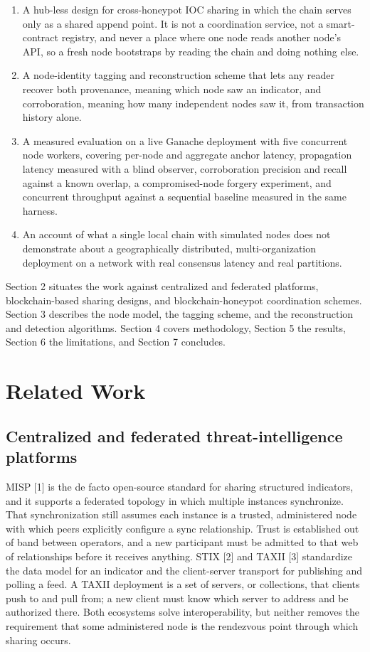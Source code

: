 \documentclass[conference]{IEEEtran}
\begin{document}
\begin{enumerate}
\item A hub-less design for cross-honeypot IOC sharing in which the chain serves only as a shared append point. It is not a coordination service, not a smart-contract registry, and never a place where one node reads another node's API, so a fresh node bootstraps by reading the chain and doing nothing else.
\item A node-identity tagging and reconstruction scheme that lets any reader recover both provenance, meaning which node saw an indicator, and corroboration, meaning how many independent nodes saw it, from transaction history alone.
\item A measured evaluation on a live Ganache deployment with five concurrent node workers, covering per-node and aggregate anchor latency, propagation latency measured with a blind observer, corroboration precision and recall against a known overlap, a compromised-node forgery experiment, and concurrent throughput against a sequential baseline measured in the same harness.
\item An account of what a single local chain with simulated nodes does not demonstrate about a geographically distributed, multi-organization deployment on a network with real consensus latency and real partitions.
\end{enumerate}

Section 2 situates the work against centralized and federated platforms, blockchain-based sharing designs, and blockchain-honeypot coordination schemes. Section 3 describes the node model, the tagging scheme, and the reconstruction and detection algorithms. Section 4 covers methodology, Section 5 the results, Section 6 the limitations, and Section 7 concludes.

\section{Related Work}

\subsection{Centralized and federated threat-intelligence platforms}

MISP [1] is the de facto open-source standard for sharing structured indicators, and it supports a federated topology in which multiple instances synchronize. That synchronization still assumes each instance is a trusted, administered node with which peers explicitly configure a sync relationship. Trust is established out of band between operators, and a new participant must be admitted to that web of relationships before it receives anything. STIX [2] and TAXII [3] standardize the data model for an indicator and the client-server transport for publishing and polling a feed. A TAXII deployment is a set of servers, or collections, that clients push to and pull from; a new client must know which server to address and be authorized there. Both ecosystems solve interoperability, but neither removes the requirement that some administered node is the rendezvous point through which sharing occurs.
\end{document}
